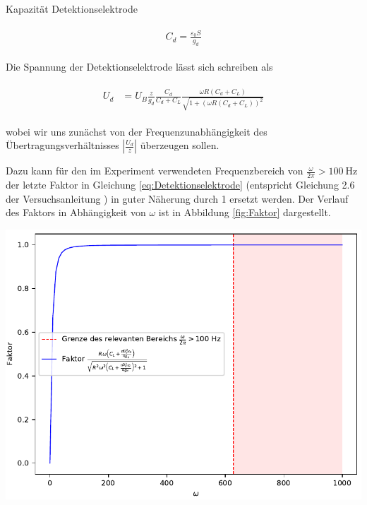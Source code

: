 Kapazität Detektionselektrode

\begin{align}
    \label{eq:KapazitaetDetektionselektrode}
    \begin{split}
        C_d = \frac{\varepsilon_0 S}{g_d}
    \end{split}
\end{align}

Die Spannung der Detektionselektrode lässt sich schreiben als

\begin{align}
    \label{eq:Detektionselektrode}
    \begin{split}
        U_d &= U_B \frac{z}{g_d} \frac{C_d}{C_d + C_L} \frac{\omega R \left( C_d + C_L \right)}{\sqrt{1+\left( \omega R \left( C_d + C_L \right) \right)^2}}
    \end{split}
\end{align}

wobei wir uns zunächst von der Frequenzunabhängigkeit des Übertragungsverhältnisses $\left| \frac{U_d}{z} \right|$ überzeugen sollen.

Dazu kann für den im Experiment verwendeten Frequenzbereich von $\frac{\omega}{2\pi} > \SI{100}{\hertz}$ der letzte Faktor in Gleichung \ref{eq:Detektionselektrode} (entspricht Gleichung 2.6 der Versuchsanleitung \cite{Anleitung}) in guter Näherung durch \SI{1}{} ersetzt werden.
Der Verlauf des Faktors in Abhängigkeit von $\omega$ ist in Abbildung \ref{fig:Faktor} dargestellt.

\minipage{\linewidth}
    \begin{center}
        \captionsetup{type=figure}
        \begin{adjustbox}{max width=\linewidth, keepaspectratio}
            \includegraphics[]{pdf/Faktor}
        \end{adjustbox}
        \label{fig:Faktor}
    \end{center}
\endminipage

